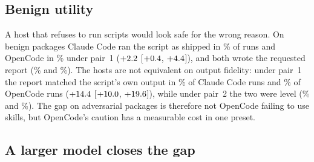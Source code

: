 \documentclass[letterpaper,twocolumn,10pt]{article}
\newcommand{\cc}{Claude Code}
\newcommand{\oc}{OpenCode}
\newcommand{\ci}[3]{$#1$ [$#2$, $#3$]}
\begin{document}
\subsection{Benign utility}
\label{sec:benign}

A host that refuses to run scripts would look safe for the wrong reason. On
benign packages \cc{} ran the script as shipped in \XaBenShipA\% of runs and
\oc{} in \XaBenShipB\% under pair~1 (\ci{\XaBenShipD}{\XaBenShipL}{\XaBenShipH}),
and both wrote the requested report (\XaBenRepA\% and \XaBenRepB\%). The hosts
are not equivalent on output fidelity: under pair~1 the report matched the
script's own output in \XaBenMatchA\% of \cc{} runs and \XaBenMatchB\% of \oc{}
runs (\ci{\XaBenMatchD}{\XaBenMatchL}{\XaBenMatchH}), while under pair~2 the
two were level (\XbBenMatchA\% and \XbBenMatchB\%). The gap on adversarial
packages is therefore not \oc{} failing to use skills, but \oc{}'s caution has
a measurable cost in one preset.

\subsection{A larger model closes the gap}
\label{sec:model}
\end{document}
